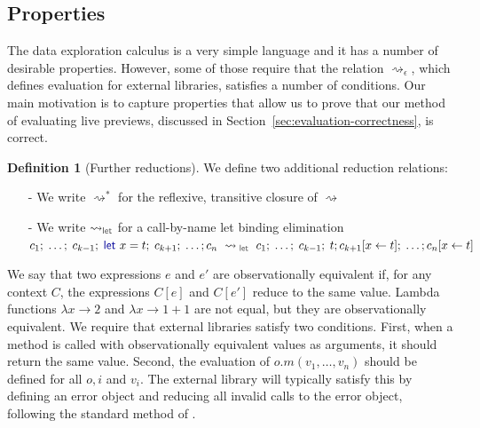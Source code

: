 \documentclass[acmsmall,anonymous,fleqn]{acmart}\settopmatter{printfolios=false,printccs=false,printacmref=false}
\newcounter{dfc}
\theoremstyle{plain}
\theoremstyle{definition}
\newtheorem{definition}[dfc]{Definition}
\newcommand{\ident}[1]{\textnormal{\textcolor{idclr}{\sffamily #1}}}
\newcommand{\kvd}[1]{\textnormal{\textcolor{kvdclr}{\sffamily #1}}}
\begin{document}
\subsection{Properties}
The data exploration calculus is a very simple language and it has a number of desirable
properties. However, some of those require that the relation $\rightsquigarrow_\epsilon$, which
defines evaluation for external libraries, satisfies a number of conditions. Our main motivation
is to capture properties that allow us to prove that our method of evaluating live previews,
discussed in Section~\ref{sec:evaluation-correctness}, is correct.

\begin{definition}[Further reductions]
\label{def:further-red}
We define two additional reduction relations:
\begin{itemize}
\item[-] We write $\rightsquigarrow^{*}$ for the reflexive, transitive closure of $\rightsquigarrow$
\item[-] We write $\rightsquigarrow_\ident{let}$ for a call-by-name let binding elimination\\
  $c_1;\; \ldots;\; c_{k-1};\; \kvd{let}~x=t;\; c_{k+1};\; \ldots; c_n ~\rightsquigarrow_\ident{let}~
  c_1;\; \ldots;\; c_{k-1};\; t; c_{k+1}[x\leftarrow t];\; \ldots; c_n[x\leftarrow t]$
\end{itemize}
\end{definition}

\noindent
We say that two expressions
$e$ and $e'$ are observationally equivalent if, for any context $C$, the expressions $C[e]$ and
$C[e']$ reduce to the same value. Lambda functions $\lambda x\!\rightarrow\!2$ and
$\lambda x\!\rightarrow\!1\!+\!1$ are not equal, but they are observationally equivalent.
We require that external libraries satisfy two conditions. First, when a method is called with
observationally equivalent values as arguments, it should return the same value. Second, the
evaluation of $o.m(v_1,\ldots,v_n)$ should be defined for all $o, i$ and $v_i$. The external
library will typically satisfy this by defining an error object and reducing all invalid calls
to the error object, following the standard method of \citet{gowrong}.
\end{document}
